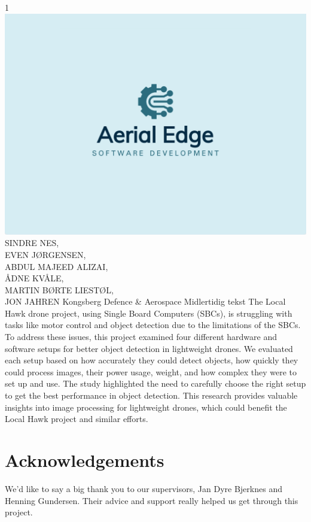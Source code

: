 \documentclass[
oneside    %
]{USN-BSc}
\begin{document}
\USNtitlepage%
{1}
{\vfill
   \includegraphics[width=\textwidth]{fig/aedgelogo.png}}
{}  %
{%
SINDRE NES,\\
EVEN JØRGENSEN,\\
ABDUL MAJEED ALIZAI,\\
ÅDNE KVÅLE,\\
MARTIN BØRTE LIESTØL,\\
JON JAHREN
}
{Kongsberg Defence \& Aerospace}
{%
Midlertidig tekst
}
{%
The Local Hawk drone project, using Single Board Computers (SBCs), is struggling with tasks like motor control and object detection due to the limitations of the SBCs. To address these issues, this project examined four different hardware and software setups for better object detection in lightweight drones. We evaluated each setup based on how accurately they could detect objects, how quickly they could process images, their power usage, weight, and how complex they were to set up and use. The study highlighted the need to carefully choose the right setup to get the best performance in object detection. This research provides valuable insights into image processing for lightweight drones, which could benefit the Local Hawk project and similar efforts.
}

\chapter{Acknowledgements}
We'd like to say a big thank you to our supervisors, Jan Dyre Bjerknes and Henning Gundersen. Their advice and support really helped us get through this project.
\end{document}
